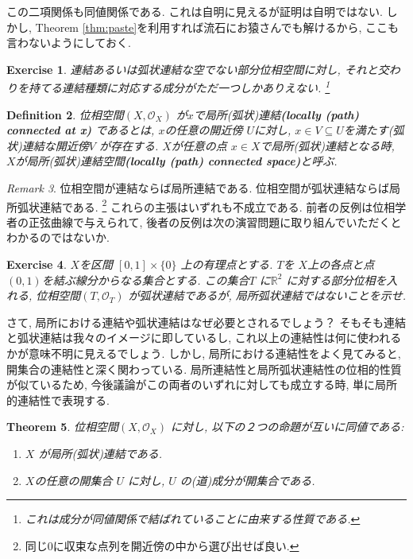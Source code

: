 \documentclass[lualatex]{ltjsbook}
\newtheorem{theorem}{Theorem}[section]
\newtheorem{definition}[theorem]{Definition}
\theoremstyle{remark}
\newtheorem{remark}[theorem]{Remark}
\theoremstyle{plain}
\newtheorem{exercise}[theorem]{Exercise}
\begin{document}
この二項関係も同値関係である. これは自明に見えるが証明は自明ではない.
しかし, Theorem \ref{thm:paste}を利用すれば流石にお猿さんでも解けるから, ここも言わないようにしておく.

\begin{exercise}
	連結あるいは弧状連結な空でない部分位相空間に対し, それと交わりを持てる連結種類に対応する成分がただ一つしかありえない. \footnote{これは成分が同値関係で結ばれていることに由来する性質である.}
\end{exercise}

\begin{definition}
	位相空間$\left( X , \mathcal{O}_{X} \right)$ が$x$で局所(弧状)連結\textbf{(locally (path) connected at x)}
	であるとは, $x$の任意の開近傍 $U$に対し, $x \in V \subseteq U$を満たす(弧状)連結な開近傍$V$ が存在する. 
	$X$が任意の点 $x \in X$で局所(弧状)連結となる時,  $X$が局所(弧状)連結空間\textbf{(locally (path) connected space)}と呼ぶ.
\end{definition}

\begin{remark}
	位相空間が連結ならば局所連結である. 位相空間が弧状連結ならば局所弧状連結である. \footnote{同じ$0$に収束な点列を開近傍の中から選び出せば良い.}
	これらの主張はいずれも不成立である. 前者の反例は位相学者の正弦曲線で与えられて, 後者の反例は次の演習問題に取り組んでいただくとわかるのではないか. 
\end{remark}

\begin{exercise}
	$X$を区間 $[0,1] \times \{0\} $ 上の有理点とする. 
	$T$を $X$上の各点と点$(0,1)$を結ぶ線分からなる集合とする.
	この集合$T$ に$\mathbb{R}^2$ に対する部分位相を入れる, 位相空間$\left( T , \mathcal{O}_{T} \right)$
	が弧状連結であるが, 局所弧状連結ではないことを示せ. 
\end{exercise}

さて, 局所における連結や弧状連結はなぜ必要とされるでしょう？
そもそも連結と弧状連結は我々のイメージに即しているし,
これ以上の連結性は何に使われるかが意味不明に見えるでしょう.
しかし, 局所における連結性をよく見てみると, 開集合の連結性と深く関わっている. 
局所連結性と局所弧状連結性の位相的性質が似ているため, 今後議論がこの両者のいずれに対しても成立する時,
単に局所的連結性で表現する.

\begin{theorem}
	位相空間$\left( X , \mathcal{O}_{X} \right)$ に対し, 以下の２つの命題が互いに同値である: 
	\begin{enumerate}
		\item $X$ が局所(弧状)連結である.
		\item $X$の任意の開集合 $U$ に対し, $U$ の(道)成分が開集合である.
	\end{enumerate}
\end{theorem}
\end{document}
